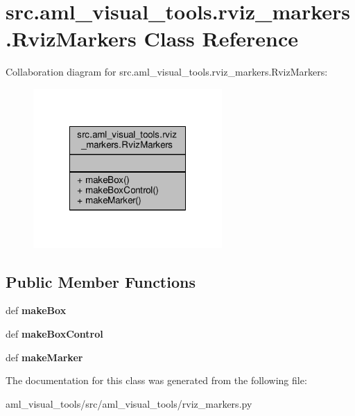\hypertarget{classsrc_1_1aml__visual__tools_1_1rviz__markers_1_1_rviz_markers}{\section{src.\-aml\-\_\-visual\-\_\-tools.\-rviz\-\_\-markers.\-Rviz\-Markers Class Reference}
\label{classsrc_1_1aml__visual__tools_1_1rviz__markers_1_1_rviz_markers}
}


Collaboration diagram for src.\-aml\-\_\-visual\-\_\-tools.\-rviz\-\_\-markers.\-Rviz\-Markers\-:
\nopagebreak
\begin{figure}[H]
\begin{center}
\leavevmode
\includegraphics[width=204pt]{classsrc_1_1aml__visual__tools_1_1rviz__markers_1_1_rviz_markers__coll__graph}
\end{center}
\end{figure}
\subsection*{Public Member Functions}
\begin{DoxyCompactItemize}
\item 
\hypertarget{classsrc_1_1aml__visual__tools_1_1rviz__markers_1_1_rviz_markers_a1464d08c98c0f8b2758fe2e51ada4f83}{def {\bfseries make\-Box}}\label{classsrc_1_1aml__visual__tools_1_1rviz__markers_1_1_rviz_markers_a1464d08c98c0f8b2758fe2e51ada4f83}

\item 
\hypertarget{classsrc_1_1aml__visual__tools_1_1rviz__markers_1_1_rviz_markers_ad2b04b2daf7bb17fa2ccbb5b11e00554}{def {\bfseries make\-Box\-Control}}\label{classsrc_1_1aml__visual__tools_1_1rviz__markers_1_1_rviz_markers_ad2b04b2daf7bb17fa2ccbb5b11e00554}

\item 
\hypertarget{classsrc_1_1aml__visual__tools_1_1rviz__markers_1_1_rviz_markers_a2f922b4a7dd10eff8f06223e15028909}{def {\bfseries make\-Marker}}\label{classsrc_1_1aml__visual__tools_1_1rviz__markers_1_1_rviz_markers_a2f922b4a7dd10eff8f06223e15028909}

\end{DoxyCompactItemize}


The documentation for this class was generated from the following file\-:\begin{DoxyCompactItemize}
\item 
aml\-\_\-visual\-\_\-tools/src/aml\-\_\-visual\-\_\-tools/rviz\-\_\-markers.\-py\end{DoxyCompactItemize}
